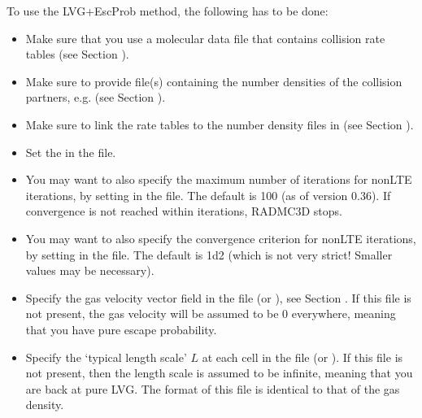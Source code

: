 \documentclass[letterpaper,10pt,english]{sphinxmanual}
\begin{document}
To use the LVG+EscProb method, the following has to be done:
\begin{itemize}
\item {} 
Make sure that you use a molecular data file that contains
collision rate tables (see Section {\hyperref[\detokenize{lineradtrans:sec-molecule-xxx-inp}]{}}).

\item {} 
Make sure to provide file(s) containing the number densities
of the collision partners, e.g. 
(see Section {\hyperref[\detokenize{lineradtrans:sec-collpartner}]{}}).

\item {} 
Make sure to link the rate tables to the number density
files in  (see Section {\hyperref[\detokenize{lineradtrans:sec-line-dot-inp}]{}}).

\item {} 
Set the  in the  file.

\item {} 
You may want to also specify the maximum number of iterations for
non\sphinxhyphen{}LTE iterations, by setting  in the
 file. The default is 100 (as of version 0.36). If
convergence is not reached within 
iterations, RADMC\sphinxhyphen{}3D stops.

\item {} 
You may want to also specify the convergence criterion
for non\sphinxhyphen{}LTE iterations, by setting 
in the  file. The default is 1d\sphinxhyphen{}2 (which is
not very strict! Smaller values may be necessary).

\item {} 
Specify the gas velocity vector field in the file 
(or ), see Section
{\hyperref[\detokenize{lineradtrans:sec-velo-field}]{}}. If this file is not present, the gas velocity will
be assumed to be 0 everywhere, meaning that you have pure escape
probability.

\item {} 
Specify the ‘typical length scale’ \(L\) at each cell in the file
 (or ). If
this file is not present, then the length scale is assumed to be infinite,
meaning that you are back at pure LVG. The format of this file is
identical to that of the gas density.

\end{itemize}
\end{document}
